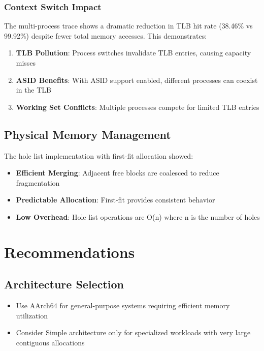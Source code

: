 \documentclass[12pt,a4paper]{article}
\begin{document}
\subsubsection{Context Switch Impact}

The multi-process trace shows a dramatic reduction in TLB hit rate (38.46\% vs 99.92\%) despite fewer total memory accesses. This demonstrates:

\begin{enumerate}
    \item \textbf{TLB Pollution}: Process switches invalidate TLB entries, causing capacity misses
    \item \textbf{ASID Benefits}: With ASID support enabled, different processes can coexist in the TLB
    \item \textbf{Working Set Conflicts}: Multiple processes compete for limited TLB entries
\end{enumerate}

\subsection{Physical Memory Management}

The hole list implementation with first-fit allocation showed:

\begin{itemize}
    \item \textbf{Efficient Merging}: Adjacent free blocks are coalesced to reduce fragmentation
    \item \textbf{Predictable Allocation}: First-fit provides consistent behavior
    \item \textbf{Low Overhead}: Hole list operations are O(n) where n is the number of holes
\end{itemize}

\section{Recommendations}

\subsection{Architecture Selection}
\begin{itemize}
    \item Use AArch64 for general-purpose systems requiring efficient memory utilization
    \item Consider Simple architecture only for specialized workloads with very large contiguous allocations
\end{itemize}
\end{document}
